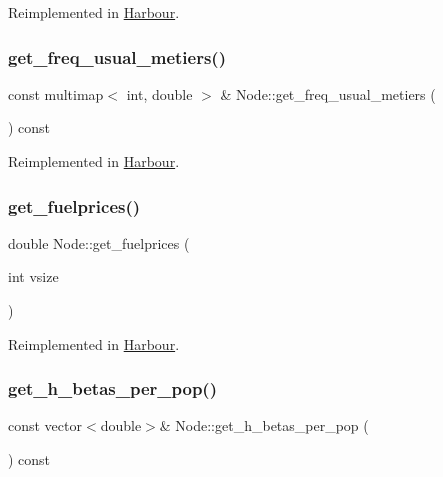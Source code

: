Reimplemented in \mbox{\hyperlink{class_harbour_a9702a762029d20bb8885e7f6d8ec0f94}{Harbour}}.

\mbox{\label{class_node_a28923d8314c4f43a9df9a74216bff48a}} 
\subsubsection{\texorpdfstring{get\_freq\_usual\_metiers()}{get\_freq\_usual\_metiers()}}
{\footnotesize\ttfamily const multimap$<$ int, double $>$ \& Node\+::get\+\_\+freq\+\_\+usual\+\_\+metiers (\begin{DoxyParamCaption}{ }\end{DoxyParamCaption}) const\hspace{0.3cm}{\ttfamily [virtual]}}



Reimplemented in \mbox{\hyperlink{class_harbour_af10263daa61fa705e1bf4be8504eb652}{Harbour}}.

\mbox{\label{class_node_ae9b986333df35cc09864019209dbef88}} 
\subsubsection{\texorpdfstring{get\_fuelprices()}{get\_fuelprices()}}
{\footnotesize\ttfamily double Node\+::get\+\_\+fuelprices (\begin{DoxyParamCaption}\item[{int}]{vsize }\end{DoxyParamCaption})\hspace{0.3cm}{\ttfamily [virtual]}}



Reimplemented in \mbox{\hyperlink{class_harbour_aa7ca7b59418bb965fe0630cbe118eea4}{Harbour}}.

\mbox{\label{class_node_ad4de963a18ab1150e93323d3a1323200}} 
\subsubsection{\texorpdfstring{get\_h\_betas\_per\_pop()}{get\_h\_betas\_per\_pop()}}
{\footnotesize\ttfamily const vector$<$double$>$\& Node\+::get\+\_\+h\+\_\+betas\+\_\+per\+\_\+pop (\begin{DoxyParamCaption}{ }\end{DoxyParamCaption}) const}

